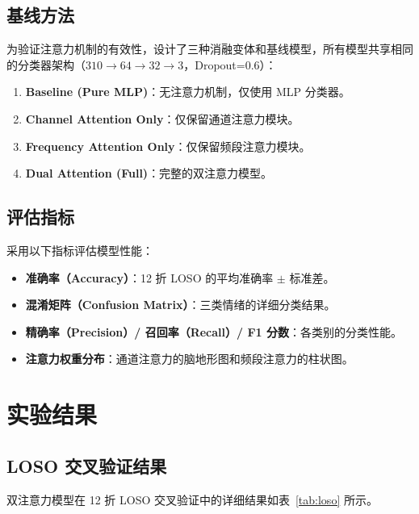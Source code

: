 \documentclass[12pt,a4paper]{ctexart}
\begin{document}
\subsection{基线方法}

为验证注意力机制的有效性，设计了三种消融变体和基线模型，所有模型共享相同的分类器架构（$310 \to 64 \to 32 \to 3$，Dropout=0.6）：

\begin{enumerate}[itemsep=0pt]
    \item \textbf{Baseline (Pure MLP)}：无注意力机制，仅使用 MLP 分类器。
    \item \textbf{Channel Attention Only}：仅保留通道注意力模块。
    \item \textbf{Frequency Attention Only}：仅保留频段注意力模块。
    \item \textbf{Dual Attention (Full)}：完整的双注意力模型。
\end{enumerate}

\subsection{评估指标}

采用以下指标评估模型性能：
\begin{itemize}[itemsep=0pt]
    \item \textbf{准确率（Accuracy）}：12 折 LOSO 的平均准确率 $\pm$ 标准差。
    \item \textbf{混淆矩阵（Confusion Matrix）}：三类情绪的详细分类结果。
    \item \textbf{精确率（Precision）/ 召回率（Recall）/ F1 分数}：各类别的分类性能。
    \item \textbf{注意力权重分布}：通道注意力的脑地形图和频段注意力的柱状图。
\end{itemize}


\section{实验结果}

\subsection{LOSO 交叉验证结果}

双注意力模型在 12 折 LOSO 交叉验证中的详细结果如表~\ref{tab:loso} 所示。
\end{document}
